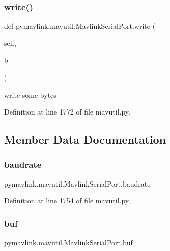 \subsubsection{\texorpdfstring{write()}{write()}}
{\footnotesize\ttfamily def pymavlink.\+mavutil.\+Mavlink\+Serial\+Port.\+write (\begin{DoxyParamCaption}\item[{}]{self,  }\item[{}]{b }\end{DoxyParamCaption})}

\begin{DoxyVerb}write some bytes\end{DoxyVerb}
 

Definition at line 1772 of file mavutil.\+py.



\subsection{Member Data Documentation}
\mbox{\label{classpymavlink_1_1mavutil_1_1MavlinkSerialPort_ab3e0c5df3be011a0a9f99cc75a87ac55}} 
\subsubsection{\texorpdfstring{baudrate}{baudrate}}
{\footnotesize\ttfamily pymavlink.\+mavutil.\+Mavlink\+Serial\+Port.\+baudrate}



Definition at line 1754 of file mavutil.\+py.

\mbox{\label{classpymavlink_1_1mavutil_1_1MavlinkSerialPort_ab05f0e2119e3e65e0f72b7ba79c28ca6}} 
\subsubsection{\texorpdfstring{buf}{buf}}
{\footnotesize\ttfamily pymavlink.\+mavutil.\+Mavlink\+Serial\+Port.\+buf}



